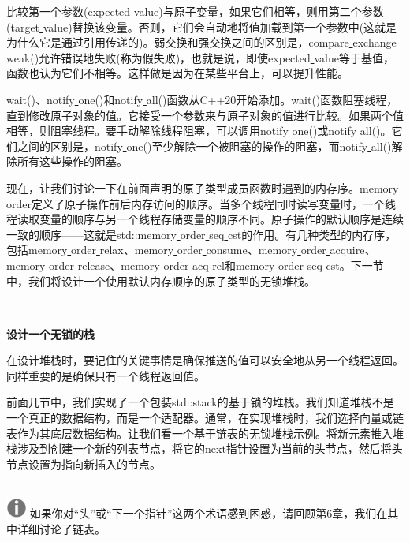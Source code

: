 比较第一个参数(expected\underline{ }value)与原子变量，如果它们相等，则用第二个参数(target\underline{ }value)替换该变量。否则，它们会自动地将值加载到第一个参数中(这就是为什么它是通过引用传递的)。弱交换和强交换之间的区别是，compare\underline{ }exchange\underline{ }weak()允许错误地失败(称为假失败)，也就是说，即使expected\underline{ }value等于基值，函数也认为它们不相等。这样做是因为在某些平台上，可以提升性能。 \par
wait()、notify\underline{ }one()和notify\underline{ }all()函数从C++20开始添加。wait()函数阻塞线程，直到修改原子对象的值。它接受一个参数来与原子对象的值进行比较。如果两个值相等，则阻塞线程。要手动解除线程阻塞，可以调用notify\underline{ }one()或notify\underline{ }all()。它们之间的区别是，notify\underline{ }one()至少解除一个被阻塞的操作的阻塞，而notify\underline{ }all()解除所有这些操作的阻塞。 \par
现在，让我们讨论一下在前面声明的原子类型成员函数时遇到的内存序。memory\underline{ }order定义了原子操作前后内存访问的顺序。当多个线程同时读写变量时，一个线程读取变量的顺序与另一个线程存储变量的顺序不同。原子操作的默认顺序是连续一致的顺序——这就是std::memory\underline{ }order\underline{ }seq\underline{ }cst的作用。有几种类型的内存序，包括memory\underline{ }order\underline{ }relax、memory\underline{ }order\underline{ }consume、memory\underline{ }order\underline{ }acquire、memory\underline{ }order\underline{ }release、memory\underline{ }order\underline{ }acq\underline{ }rel和memory\underline{ }order\underline{ }seq\underline{ }cst。下一节中，我们将设计一个使用默认内存顺序的原子类型的无锁堆栈。 \par

\noindent\textbf{}\ \par
\textbf{设计一个无锁的栈} \ \par
在设计堆栈时，要记住的关键事情是确保推送的值可以安全地从另一个线程返回。同样重要的是确保只有一个线程返回值。 \par
前面几节中，我们实现了一个包装std::stack的基于锁的堆栈。我们知道堆栈不是一个真正的数据结构，而是一个适配器。通常，在实现堆栈时，我们选择向量或链表作为其底层数据结构。让我们看一个基于链表的无锁堆栈示例。将新元素推入堆栈涉及到创建一个新的列表节点，将它的next指针设置为当前的头节点，然后将头节点设置为指向新插入的节点。 \par

\hspace*{\fill} \\ %
\includegraphics[width=0.05\textwidth]{images/warn}
如果你对“头”或“下一个指针”这两个术语感到困惑，请回顾第6章，我们在其中详细讨论了链表。 \par
\noindent\textbf{}\ \par

